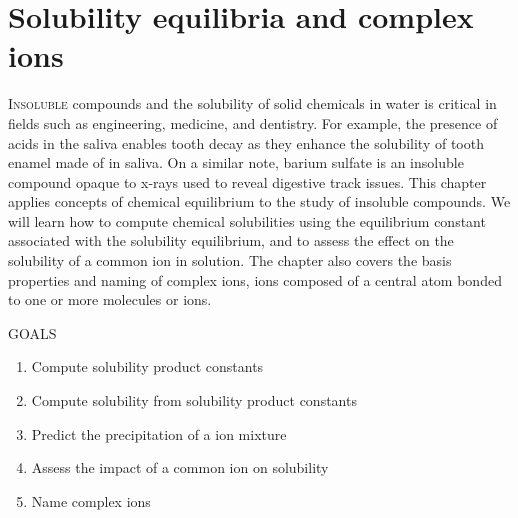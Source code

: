 \documentclass[main.tex]{subfiles}
\begin{document}
\chapter[Solubility equilibria ]{Solubility equilibria and complex ions}


\begin{marginfigure}
\end{marginfigure}



   
\lettrine[lines=4]{\color{black!45}I}{nsoluble} compounds and the solubility of solid chemicals in water is critical in fields such as engineering, medicine, and dentistry. For example, the presence of acids in the saliva enables tooth decay as they enhance the solubility of tooth enamel made of  in saliva. On a similar note, barium sulfate is an insoluble compound opaque to x-rays used to reveal digestive track issues. This chapter applies concepts of chemical equilibrium to the study of insoluble compounds. We will learn how to compute chemical solubilities using the equilibrium constant associated with the solubility equilibrium, and to assess the effect on the solubility of a common ion in solution. The chapter also covers the basis properties and naming of complex ions, ions composed of a central atom bonded to one or more molecules or ions.
\begin{marginfigure}%
\begin{mytcbox}{GOALS}
\begin{enumerate}[label=\protect\circled{\color{white}\arabic*}]
\item Compute solubility product constants
\item Compute solubility from solubility product constants
\item Predict the precipitation of a ion mixture
\item Assess the impact of a common ion on solubility
\item Name complex ions
\end{enumerate}
\end{mytcbox}
\vspace{1cm}
\begin{tcolorbox}[enhanced,colback=red!5!white,colframe=black!50!red,boxrule=1pt,
  arc=0pt,outer arc=0pt,drop heavy lifted shadow]
\faGears\ 
 {\discussionSOLUBLE} \end{tcolorbox}

\end{marginfigure}%
\end{document}
